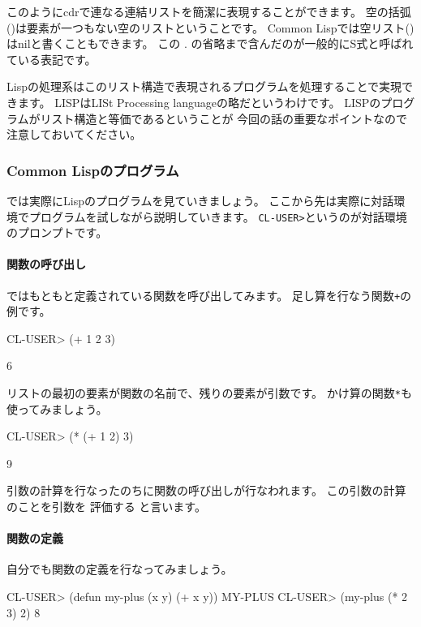 \documentclass[mingoth,a4paper]{jsarticle}
\begin{document}
このようにcdrで連なる連結リストを簡潔に表現することができます。
空の括弧()は要素が一つもない空のリストということです。
Common Lispでは空リスト()はnilと書くこともできます。
この . の省略まで含んだのが一般的にS式と呼ばれている表記です。

Lispの処理系はこのリスト構造で表現されるプログラムを処理することで実現できます。
LISPはLISt Processing languageの略だというわけです。
LISPのプログラムがリスト構造と等価であるということが
今回の話の重要なポイントなので注意しておいてください。

\subsubsection{Common Lispのプログラム}

では実際にLispのプログラムを見ていきましょう。
ここから先は実際に対話環境でプログラムを試しながら説明していきます。
\verb|CL-USER>|というのが対話環境のプロンプトです。

\paragraph{関数の呼び出し}

ではもともと定義されている関数を呼び出してみます。
足し算を行なう関数\verb|+|の例です。

\begin{commandline}
CL-USER> (+ 1 2 3)

6
\end{commandline}

リストの最初の要素が関数の名前で、残りの要素が引数です。
かけ算の関数\verb|*|も使ってみましょう。

\begin{commandline}
CL-USER> (* (+ 1 2) 3)

9
\end{commandline}

引数の計算を行なったのちに関数の呼び出しが行なわれます。
この引数の計算のことを引数を 評価する と言います。

\paragraph{関数の定義}

自分でも関数の定義を行なってみましょう。

\begin{commandline}
CL-USER> (defun my-plus (x y)
 (+ x y))
MY-PLUS
CL-USER> (my-plus (* 2 3) 2)
8
\end{commandline}
\end{document}
